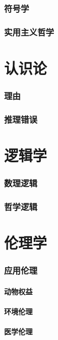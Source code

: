 \documentclass[UTF8]{../RepresentationUniverse}
\begin{document}
    \subsection{符号学}
    \subsection{实用主义哲学}
    




\chapter{认识论}
    \subsection{理由}
    \subsection{推理错误}

\chapter{逻辑学}
    \subsection{数理逻辑}
    \subsection{哲学逻辑}       

\chapter{伦理学}
    \subsection{应用伦理}
        \subsubsection{动物权益}
        \subsubsection{环境伦理}
        \subsubsection{医学伦理}
\end{document}
